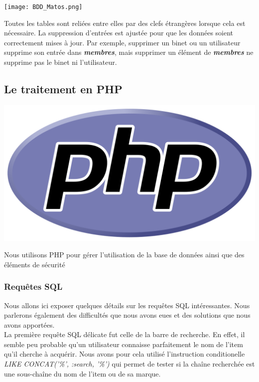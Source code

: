 \documentclass[titlepage,11pt,a4paper]{article}
\begin{document}
\begin{center}
\texttt{[image: BDD\_Matos.png]}
\end{center}

Toutes les tables sont reliées entre elles par des clefs étrangères lorsque cela est nécessaire. La suppression d'entrées est ajustée pour que les données soient correctement mises à jour. Par exemple, supprimer un binet ou un utilisateur supprime son entrée dans \textbf{\emph{membres}}, mais supprimer un élément de \textbf{\emph{membres}} ne supprime pas le binet ni l'utilisateur.

\subsection{Le traitement en PHP}

\begin{center}
\includegraphics[scale=0.05]{php.png}
\end{center}

Nous utilisons PHP pour gérer l'utilisation de la base de données ainsi que des éléments de sécurité

\subsubsection{Requêtes SQL}

Nous allons ici exposer quelques détails sur les requêtes SQL intéressantes. Nous parlerons également des difficultés que nous avons eues et des solutions que nous avons apportées.\\

La première requête SQL délicate fut celle de la barre de recherche. En effet, il semble peu probable qu'un utilisateur connaisse parfaitement le nom de l'item qu'il cherche à acquérir. Nous avons pour cela utilisé l'instruction conditionelle \emph{LIKE CONCAT('\%', :search, '\%')} qui permet de tester si la chaîne recherchée est une sous-chaîne du nom de l'item ou de sa marque.\\
\end{document}
